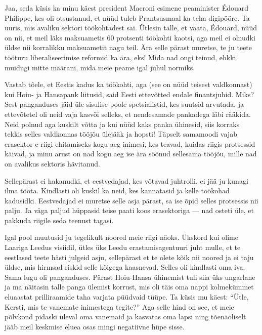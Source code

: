 
Jaa, seda küsis ka minu käest president 
Macroni esimene peaminister Édouard Philippe, kes oli otsustanud, et nüüd tuleb Prantsusmaal ka teha 
digipööre. Ta uuris, mis avaliku sektori
töökohtadest sai. Ütlesin talle, et vaata, Édouard, 
nüüd on nii, et meil läks maksuametis 60 protsenti töökohti kaotsi, aga meil 
ei olnudki üldse nii korralikku maksuametit nagu teil. Ära selle pärast 
muretse, te ju teete tööturu liberaliseerimise reformid ka ära, eks! Mida 
nad ongi teinud, ehkki muidugi mitte määrani, mida meie peame igal 
juhul normiks. 

Vastab tõele, et Eestis kadus ka töökohti, aga (see on nüüd 
teisest valdkonnast) kui Hoiu- ja Hansapank liitusid, said Eesti ettevõtted endale finantsjuhid. Miks? Sest panganduses jäid üle sisulise poole spetsialistid, kes suutsid arvutada, 
ja ettevõtetel oli neid vaja kasvõi 
selleks, et nendesamade pankadega läbi rääkida. Neid polnud aga kuskilt võtta ja kui nüüd
kaks panka ühinesid, siis korraks tekkis selles valdkonnas tööjõu ülejääk 
ja hopsti! Täpselt samamoodi vajab erasektor e-riigi 
ehitamiseks kogu aeg inimesi, kes teavad, kuidas riigis protsessid käivad, ja minu 
arust on nad kogu aeg ise ära söönud sellesama tööjõu, mille nad on avalikus 
sektoris hävitanud.


Sellepärast ei hakanudki, et eestvedajad, kes võtavad 
juhtrolli, ei jää ju kunagi ilma tööta. Kindlasti oli kuskil ka neid, kes 
kannatasid ja kelle töökohad kadusidki. Eestvedajad ei 
muretse selle asja pärast, sa ise õpid selles protsessis nii palju. Ja 
väga paljud hüppasid teise paati koos erasektoriga --- nad osteti üle, et pakkuda riigile seda teenust tagasi.


Igal pool muutusid ju tegelikult noored meie riigi näoks. Ükskord kui olime Laariga Leedus visiidil, ütles üks Leedu erastamisagentuuri juht mulle, et te eestlased teete hästi julgeid asju, sellepärast 
et te olete kõik nii noored ja ei taju üldse, mis hirmsad riskid selle kõigega 
kaasnevad. Selles oli kindlasti oma iva. Sama lugu oli panganduses. Pärast Hoiu-Hansa ühinemist tuli siia üks 
ungarlane ja ma näitasin talle panga
ülemist korrust, mis oli täis oma nappi kolmekümmet eluaastat 
prilliraamide taha varjata püüdvaid tüüpe. Ta küsis mu käest: 
\enquote{Ütle, Kersti, mis te vanemate inimestega tegite?} Aga selle hind on 
see, et meie põlvkond pidaski üleval oma vanemaid ja kasvatas oma lapsi ning
tõenäoliselt jääb meil keskmise eluea osas mingi negatiivne hüpe 
sisse.

